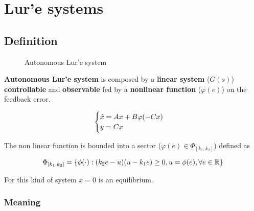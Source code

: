 \usepackage{hyperref}\usepackage{hyperref}\chapter{Lur'e systems}

\section{Definition}

\begin{figure}[htb]
    \centering
    \caption{Autonomous Lur'e system}
    \label{fig:lure-system}
\end{figure}

\textbf{Autonomous Lur'e system} is composed by a \textbf{linear system} ($G(s)$) \textbf{controllable} and \textbf{observable} fed by a \textbf{nonlinear function} ($\varphi(e)$) on the feedback error.

\[
    \begin{cases}
        \dot{x} = A x + B \varphi(-Cx) \\
        y = C x
    \end{cases}
\]

The non linear function is bounded into a sector ($\varphi(e) \in \Phi_{[k_1,k_2]}$) defined as

\[
    \Phi_{[k_1,k_2]} = \{\phi(\cdot) : (k_2 e -u)(u - k_1 e) \geq 0, u=\phi(e), \forall e \in \mathbb{R} \}
\]

For this kind of system $\bar{x} = 0$ is an equilibrium.

\subsection{Meaning}

